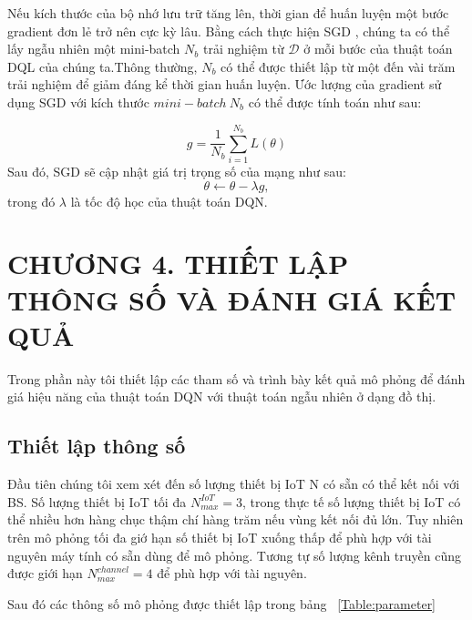 \documentclass{article} %
\begin{document}
Nếu kích thước của bộ nhớ lưu trữ tăng lên, thời gian để huấn luyện một bước gradient đơn lẻ trở nên cực kỳ lâu. Bằng cách thực hiện SGD \cite{SGD}, chúng ta có thể lấy ngẫu nhiên một mini-batch $N_b$ trải nghiệm từ $\mathcal{D}$ ở mỗi bước của thuật toán DQL của chúng ta.Thông thường, $N_b$ có thể được thiết lập từ một đến vài trăm trải nghiệm để giảm đáng kể thời gian huấn luyện. Ước lượng của gradient sử dụng SGD với kích thước $mini-batch\ N_b$ có thể được tính toán như sau:

\begin{equation}
    g = \frac{1}{N_b}\sum^{N_b}_{i=1}L(\theta)
\end{equation}
Sau đó, SGD sẽ cập nhật giá trị trọng số của mạng như sau:
\begin{equation}
    \theta \gets \theta - \lambda g,
\end{equation}
trong đó $\lambda$ là tốc độ học của thuật toán DQN.

\newpage
\section*{CHƯƠNG 4. THIẾT LẬP THÔNG SỐ VÀ ĐÁNH GIÁ KẾT QUẢ}
\setcounter{section}{4}
\setcounter{subsection}{0}
\setcounter{figure}{0}
\setcounter{table}{0}

Trong phần này tôi thiết lập các tham số và trình bày kết quả mô phỏng để đánh giá hiệu năng của thuật toán DQN với thuật toán ngẫu nhiên ở dạng đồ thị.

\subsection{Thiết lập thông số}
Đầu tiên chúng tôi xem xét đến số lượng thiết bị IoT N có sẵn có thể kết nối với BS. Số lượng thiết bị IoT tối đa $N_{max}^{IoT}=3$, trong thực tế số lượng thiết bị IoT có thể nhiều hơn hàng chục thậm chí hàng trăm nếu vùng kết nối đủ lớn. Tuy nhiên trên mô phỏng tối đa giớ hạn số thiết bị IoT xuống thấp để phù hợp với tài nguyên máy tính có sẵn dùng để mô phỏng. Tương tự số lượng kênh truyền cũng được giới hạn $N_{max}^{channel}=4$ để phù hợp với tài nguyên.

Sau đó các thông số mô phỏng được thiết lập trong bảng ~\ref{Table:parameter}
\end{document}
